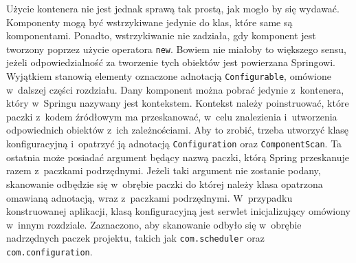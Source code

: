 \documentclass[a4paper]{book}
\begin{document}
{Użycie kontenera nie jest jednak sprawą tak prostą, jak mogło by się wydawać. Komponenty mogą być wstrzykiwane jedynie do klas, które same są komponentami. Ponadto, wstrzykiwanie nie zadziała, gdy komponent jest tworzony poprzez użycie operatora \lstinline|new|. Bowiem nie miałoby to większego sensu, jeżeli odpowiedzialność za tworzenie tych obiektów jest powierzana Springowi. Wyjątkiem stanowią elementy oznaczone adnotacją \lstinline|Configurable|, omówione w~dalszej części rozdziału. Dany komponent można pobrać jedynie z~kontenera, który w~Springu nazywany jest kontekstem. Kontekst należy poinstruować, które paczki z~kodem źródłowym ma przeskanować, w~celu znalezienia i~utworzenia odpowiednich obiektów z~ich zależnościami. Aby to zrobić, trzeba utworzyć klasę konfiguracyjną i~opatrzyć ją adnotacją \lstinline|Configuration| oraz \lstinline|ComponentScan|. Ta ostatnia może posiadać argument będący nazwą paczki, którą Spring przeskanuje razem z~paczkami podrzędnymi. Jeżeli taki argument nie zostanie podany, skanowanie odbędzie się w~obrębie paczki do której należy klasa opatrzona omawianą adnotacją, wraz z~paczkami podrzędnymi. W~przypadku konstruowanej aplikacji, klasą konfiguracyjną jest serwlet inicjalizujący omówiony w~innym rozdziale. Zaznaczono, aby skanowanie odbyło się w~obrębie nadrzędnych paczek projektu, takich jak \lstinline|com.scheduler| oraz \lstinline|com.configuration|.

}
\end{document}
